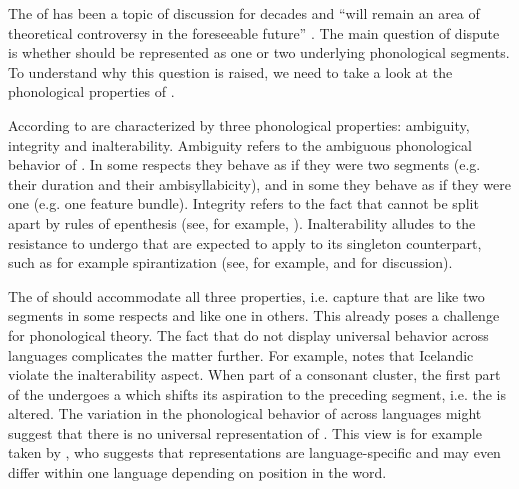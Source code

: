 The  of  has been a topic of discussion for decades and  ``will remain an area of theoretical controversy in the foreseeable future'' \cite[22]{Davis.2011}. The main question of dispute is whether  should be represented as one or two underlying phonological segments. To understand why this question is raised, we need to take a look at the phonological properties of . 

According to \cite{Hayes.1986b}  are characterized by three phonological properties: ambiguity, integrity and inalterability. Ambiguity refers to the ambiguous phonological behavior of . In some respects they behave as if they were two segments (e.g. their duration and their ambisyllabicity), and in some they behave as if they were one (e.g. one feature bundle). Integrity refers to the fact that   cannot be split apart by rules of epenthesis (see, for example,  \citealt{AbuSalim.,Kenstowicz.1994}).  Inalterability alludes to the  resistance to undergo  that are expected to apply to its singleton counterpart, such as for example spirantization (see, for example, \citealt {Kenstowicz.1994} and \citealt[chapter 5]{Kirchner.2001} for discussion). 

The  of  should accommodate all three properties, i.e. capture that  are like two segments in some respects and like one in others. This already poses a challenge for phonological theory. The fact that  do not display universal behavior across languages complicates the matter further. For example, \cite{Kenstowicz.1994} notes that Icelandic  violate the inalterability aspect. When part of a consonant cluster, the first part of the  undergoes a  which shifts its aspiration to the preceding segment, i.e. the  is altered.
 The variation in the phonological behavior of  across languages might suggest that there is no universal representation of .  This view is for example taken by \cite{Ham.2001}, who suggests that representations are language-specific and may even differ within one language depending on  position in the word.
 
